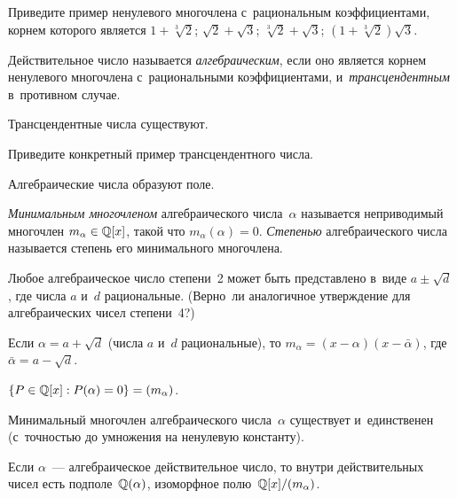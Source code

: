 \documentclass[a4paper, 12pt]{article}
\begin{document}


Приведите пример ненулевого многочлена с~рациональным коэффициентами, корнем которого является
 $1+\sqrt[3]2$;\quad
{} $\sqrt2+\sqrt3$;\quad
{} $\sqrt[3]2+\sqrt3$;\quad
{} $(1+\sqrt[3]2)\sqrt3$.






Действительное число называется \emph{алгебраическим}, если оно является корнем ненулевого многочлена с~рациональными коэффициентами, и~\emph{трансцендентным} в~противном случае.




 Трансцендентные числа существуют.

 Приведите конкретный пример трансцендентного числа.






Алгебраические числа образуют поле.






\emph{Минимальным многочленом} алгебраического числа~$\alpha$ называется неприводимый многочлен $m_\alpha\in\mathbb{Q}[x]$, такой что $m_\alpha(\alpha)=0$. \emph{Степенью} алгебраического числа называется степень его минимального многочлена.




 Любое алгебраическое число степени~2 может быть представлено в~виде $a\pm\sqrt d$, где числа $a$ и~$d$ рациональные. (Верно~ли аналогичное утверждение для алгебраических чисел степени~4?)

 Если $\alpha=a+\sqrt d$ (числа $a$ и~$d$ рациональные), то $m_\alpha=(x-\alpha)(x-\bar\alpha)$, где $\bar\alpha=a-\sqrt d$.






 $\{P\in\mathbb{Q}[x] : P(\alpha)=0\}=(m_\alpha)$.

 Минимальный многочлен алгебраического числа~$\alpha$ существует и~единственен (с~точностью до умножения на ненулевую константу).






Если $\alpha$~--- алгебраическое действительное число, то внутри действительных чисел есть подполе~$\mathbb{Q}(\alpha)$, изоморфное полю~$\mathbb{Q}[x]/(m_\alpha)$.
\end{document}
